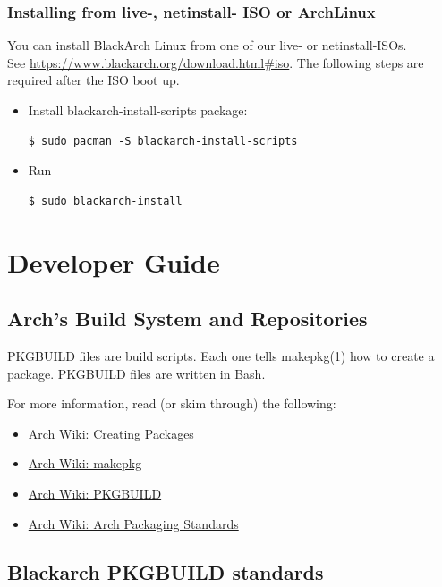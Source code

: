 \documentclass[a4paper, oneside, 11pt]{book}
\begin{document}
\subsection{Installing from live-, netinstall- ISO or ArchLinux}
You can install BlackArch Linux from one of our live- or netinstall-ISOs.\\See
\url{https://www.blackarch.org/download.html#iso}. The following steps are
required after the ISO boot up.
\begin{itemize}
\item Install blackarch-install-scripts package:
{\small
\color{gray}
\begin{verbatim}
$ sudo pacman -S blackarch-install-scripts
\end{verbatim}
}
\item Run
{\small
\color{gray}
\begin{verbatim}
$ sudo blackarch-install
\end{verbatim}
}
\end{itemize}


\chapter{Developer Guide}

\section{Arch's Build System and Repositories}

PKGBUILD files are build scripts. Each one tells makepkg(1) how to create a package. PKGBUILD files
are written in Bash.

For more information, read (or skim through) the following:
\begin{itemize}
	\item \href{https://wiki.archlinux.org/index.php/Creating_Packages}{Arch Wiki: Creating Packages}
	\item \href{https://wiki.archlinux.org/index.php/Makepkg}{Arch Wiki: makepkg}
	\item \href{https://wiki.archlinux.org/index.php/PKGBUILD}{Arch Wiki: PKGBUILD}
	\item \href{https://wiki.archlinux.org/index.php/Arch_Packaging_Standards}{Arch Wiki: Arch Packaging Standards}
\end{itemize}

\section{Blackarch PKGBUILD standards}
\end{document}
